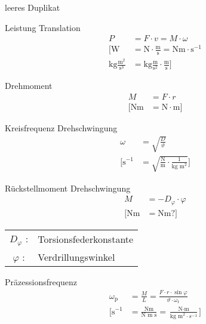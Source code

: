 \begin{karte}{leeres Duplikat}
\end{karte}

\begin{karte}{Leistung Translation}
    \begin{align*}
       P &= F \cdot v = M \cdot \omega \\
       \bigg[ \text{W} &= \text{N} \cdot \frac{\text{m}}{\text{s}}  = \text{Nm} \cdot \text{s}^{-1} \\
           \text{kg} \frac{\text{m}^2}{\text{s}^3} &= \text{kg}\frac{\text{m}}{\text{s}^2} \cdot \frac{\text{m}}{\text{s}}
           \bigg]
    \end{align*}
\end{karte}

\begin{karte}{Drehmoment}
    \begin{align*}
        M &= F \cdot r \\
        \bigg[ \text{Nm} &=
            \text{N} \cdot \text{m}
            \bigg]
    \end{align*}
\end{karte}

\begin{karte}{Kreisfrequenz Drehschwingung}
    \begin{align*}
        \omega &= \sqrt{\frac{D}{\vartheta}} \\
        \bigg[ \text{s}^{-1} &=  \sqrt{ \frac{\text{N}}{\text{m}} \cdot \frac{1}{\text{kg m}^2 }}
            \bigg]
    \end{align*}
\end{karte}

\begin{karte}{Rückstellmoment Drehschwingung}
    \begin{align*}
        M &= -D_\varphi \cdot \varphi \\
        [ \text{Nm} &= \text{Nm?} ]
    \end{align*}
    \begin{tabular}[t]{cl}
        \(D_\varphi\) :& Torsionsfederkonstante \\
        \(\varphi\) :& Verdrillungswinkel
    \end{tabular}
\end{karte}

\begin{karte}{Präzessionsfrequenz}
     \begin{align*}
         \omega_\text{p} &= \frac{M}{L} = \frac{ F \cdot r \cdot \sin \varphi }{ \vartheta \cdot \omega_\text{r}} \\
         \bigg[ \text{s}^{-1} &= \frac{\text{Nm}}{\text{N m s}} 
             = \frac{\text{N} \cdot \text{m}}{\text{kg m}^2 \cdot s^{-1}}
            \bigg]
     \end{align*}
\end{karte}

